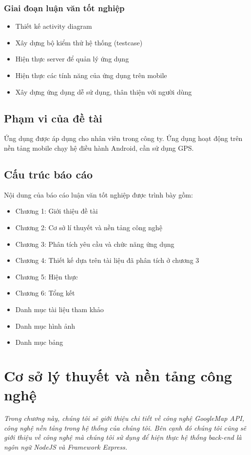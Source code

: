 \documentclass[a4paper]{article}
\begin{document}
\subsubsection{Giai đoạn luận văn tốt nghiệp}
\begin{itemize}    
    \item Thiết kế activity diagram
    \item Xây dựng bộ kiểm thử hệ thống (testcase)
    \item Hiện thực server để quản lý ứng dụng
    \item Hiện thực các tính năng của ứng dụng trên mobile
    \item Xây dựng ứng dụng dễ sử dụng, thân thiện với người dùng
\end{itemize}
\subsection{Phạm vi của đề tài}
Ứng dụng được áp dụng cho nhân viên trong công ty. Ứng dụng hoạt động trên nền tảng mobile chạy hệ điều hành Android, cần sử dụng GPS.
\subsection{Cấu trúc báo cáo}
Nội dung của báo cáo luận văn tốt nghiệp được trình bày gồm:
\begin{itemize}    
    \item Chương 1: Giới thiệu đề tài
    \item Chương 2: Cơ sở lí thuyết và nền tảng công nghệ
    \item Chương 3: Phân tích yêu cầu và chức năng ứng dụng
    \item Chương 4: Thiết kế dựa trên tài liệu đã phân tích ở chương 3
    \item Chương 5: Hiện thực 
    \item Chương 6: Tổng kết
    \item Danh mục tài liệu tham khảo
    \item Danh mục hình ảnh
    \item Danh mục bảng 
\end{itemize}

\section{Cơ sở lý thuyết và nền tảng công nghệ}
\textit{Trong chương này, chúng tôi sẽ giới thiệu chi tiết về công nghệ GoogleMap API, công nghệ nền tảng trong hệ thống của chúng tôi. Bên cạnh đó chúng tôi cũng sẽ giới thiệu về công nghệ mà chúng tôi sử dụng để hiện thực hệ thống back-end là ngôn ngữ NodeJS và Framework Express.}
\end{document}
